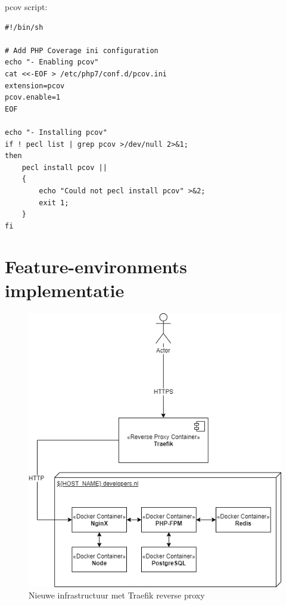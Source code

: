 pcov script:
\begin{verbatim}
#!/bin/sh

# Add PHP Coverage ini configuration
echo "- Enabling pcov"
cat <<-EOF > /etc/php7/conf.d/pcov.ini
extension=pcov
pcov.enable=1
EOF

echo "- Installing pcov"
if ! pecl list | grep pcov >/dev/null 2>&1;
then
    pecl install pcov ||
    {
        echo "Could not pecl install pcov" >&2;
        exit 1;
    }
fi
\end{verbatim}

\section{Feature-environments implementatie} \label{CodeFeatureEnvironments}
\begin{figure}[H]
	\centering
	\includegraphics[width=13cm]{Figures/Traefik}
	\decoRule
	\caption[Traefik Infrastructure]{Nieuwe infrastructuur met Traefik reverse proxy}
	\label{fig:traefikinfrastructure}
\end{figure}
